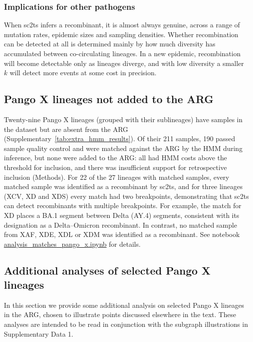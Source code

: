 \documentclass[12pt]{article}
\newcommand{\siref}[1]{Supplementary~\ref{#1}}
\begin{document}
\subsubsection{Implications for other pathogens}
When sc2ts infers a recombinant, it is almost always genuine,
across a range of mutation rates, epidemic sizes and sampling densities.
Whether recombination can be detected at all is determined mainly by how
much diversity has accumulated between co-circulating lineages.
In a new epidemic, recombination will become detectable only as lineages diverge,
and with low diversity a smaller $k$ will detect more events
at some cost in precision.


\subsection{Pango X lineages not added to the ARG}
\label{sec:supplement_rejected_pango_x_lineages}

Twenty-nine Pango X lineages (grouped with their sublineages)
have samples in the dataset but are absent from the ARG
(\siref{tab:extra_hmm_results}).
Of their 211 samples, 190 passed sample quality control and
were matched against the ARG by the HMM during inference,
but none were added to the ARG:
all had HMM costs above the threshold for inclusion,
and there was insufficient support for retrospective inclusion (Methods).
For 22 of the 27 lineages with matched samples,
every matched sample was identified as a recombinant by sc2ts,
and for three lineages (XCV, XD and XDS) every match had two breakpoints,
demonstrating that sc2ts can detect recombinants with multiple breakpoints.
For example, the match for XD places a BA.1 segment
between Delta (AY.4) segments,
consistent with its designation as a Delta--Omicron recombinant.
In contrast, no matched sample from XAF, XDE, XDL or XDM
was identified as a recombinant.
See notebook
\href{https://github.com/jeromekelleher/sc2ts-paper/blob/main/notebooks/analysis\_matches\_pango\_x.ipynb}
{analysis\_matches\_pango\_x.ipynb} for details.


\subsection{Additional analyses of selected Pango X lineages}
\label{sec:supplement_indepth_pango_x_lineages}
In this section we provide some additional analysis on selected Pango X
lineages in the ARG, chosen to illustrate points discussed elsewhere in the
text. These analyses are intended to be read in conjunction with
the subgraph illustrations in Supplementary Data 1.
\end{document}
